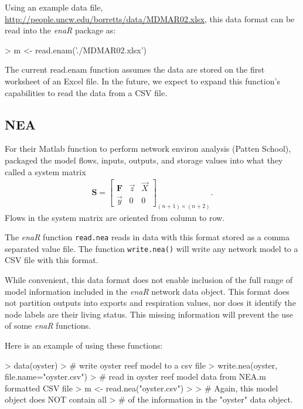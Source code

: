 \documentclass[11pt]{article}
\begin{document}
Using an example data file,
\url{http://people.uncw.edu/borretts/data/MDMAR02.xlsx}, this data
format can be read into the \textit{enaR} package as:

\begin{Schunk}
\begin{Sinput}
>   m <- read.enam('./MDMAR02.xlsx')
\end{Sinput}
\end{Schunk}

The current read.enam function assumes the data are stored on the
first worksheet of an Excel file. In the future, we expect to expand
this function's capabilities to read the data from a CSV file.  

\subsection*{NEA}

For their Matlab function to perform network environ analysis (Patten School),
\citet{fath06} packaged the model flows, inputs, outputs, and storage
values into what they called a system matrix 
\begin{align}
\mathbf{S} = \left[ \begin{array}{ccc} \mathbf{F} & \vec{z} & \vec{X} \\
     \vec{y}  &  0 & 0 \end{array} 
\right]_{(n+1) \times (n+2)}.
\end{align}
Flows in the system matrix are oriented from column to row.

The \textit{enaR} function \texttt{read.nea} reads in data with this
format stored as a comma separated value file.  The function
\texttt{write.nea()} will write any network model to a CSV file with
this format.  

While convenient, this data format does not enable inclusion of the
full range of model information included in the \textit{enaR} network
data object.  This format does not partition outputs into exports and
respiration values, nor does it identify the node labels are their
living status. This missing information will prevent the use of some
\textit{enaR} functions.  

Here is an example of using these functions:
\begin{Schunk}
\begin{Sinput}
> data(oyster)
> # write oyster reef model to a csv file
> write.nea(oyster, file.name="oyster.csv")
> # read in oyster reef model data from NEA.m formatted CSV file
> m <- read.nea("oyster.csv")
> 
> # Again, this model object does NOT contain all 
> # of the information in the "oyster" data object.
\end{Sinput}
\end{Schunk}
\end{document}
